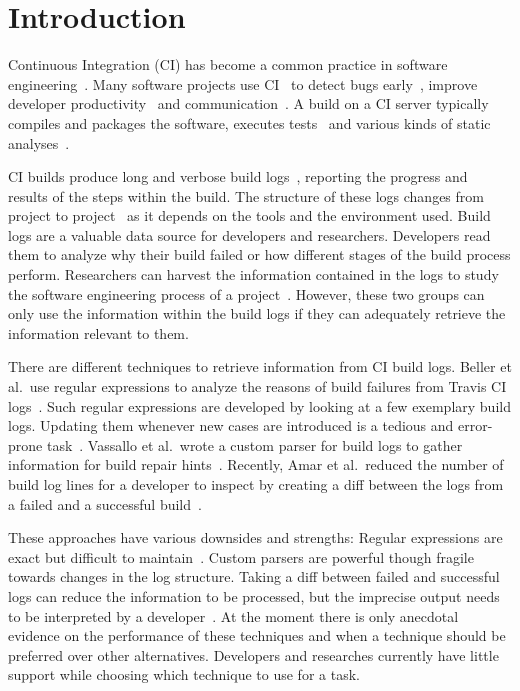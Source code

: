 \documentclass[\myrootdir/main.tex]{subfiles}
\begin{document}
\chapter{Introduction}
Continuous Integration (CI) has become a common practice in software engineering~\cite{hilton2016usage}.
Many software projects use CI~\cite{hilton2016usage,staahl2014modeling,beller2017oops} to detect bugs early~\cite{vasilescu2015quality,duvall2007continuous}, improve developer productivity~\cite{miller2008hundred,hilton2016usage} and communication~\cite{downs2012ambient}.
A build on a CI server typically compiles and packages the software, executes tests~\cite{beller2017oops} and various kinds of static analyses~\cite{zampetti2017open}.

CI builds produce long and verbose build logs~\cite{beller2017oops}, reporting the progress and results of the steps within the build.
The structure of these logs changes from project to project~\cite{staahl2014modeling} as it depends on the tools and the environment used.
Build logs are a valuable data source for developers and researchers.
Developers read them to analyze why their build failed or how different stages of the build process perform.
Researchers can harvest the information contained in the logs to study the software engineering process of a project~\cite{rausch2017empirical,beller2017oops,seo2014programmers,vassallo2017a-tale}.
However, these two groups can only use the information within the build logs if they can adequately retrieve the information relevant to them.

There are different techniques to retrieve information from CI build logs. Beller et al.\ use regular expressions to analyze the reasons of build failures from Travis CI logs~\cite{beller2017oops}.
Such regular expressions are developed by looking at a few exemplary build logs. Updating them whenever new cases are introduced is a tedious and error-prone task~\cite{michael2019regexes}.
Vassallo et al.\ wrote a custom parser for build logs to gather information for build repair hints~\cite{vassallo2018un-break}.
Recently, Amar et al.\ reduced the number of build log lines for a developer to inspect by creating a diff between the logs from a failed and a successful build~\cite{amar2019mining}.

These approaches have various downsides and strengths:
Regular expressions are exact but difficult to maintain~\cite{michael2019regexes}.
Custom parsers are powerful though fragile towards changes in the log structure.
Taking a diff between failed and successful logs can reduce the information to be processed, but the imprecise output needs to be interpreted by a developer~\cite{amar2019mining}.
At the moment there is only anecdotal evidence on the performance of these techniques and when a technique should be preferred over other alternatives.
Developers and researches currently have little support while choosing which technique to use for a task.
\end{document}
